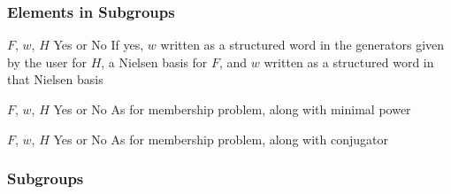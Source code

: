 \subsubsection{Elements in Subgroups}

\begin{enumerate}

{$F$, $w$, $H$}
{Yes or No}
{If yes, $w$ written as a structured word in the generators given by
the user for $H$, a Nielsen basis for $F$, and $w$ written as a
structured word in that Nielsen basis
}

{$F$, $w$, $H$}
{Yes or No}
{As for membership problem, along with minimal power}

{$F$, $w$, $H$}
{Yes or No}
{As for membership problem, along with conjugator}

\end{enumerate}


\subsubsection{Subgroups}

